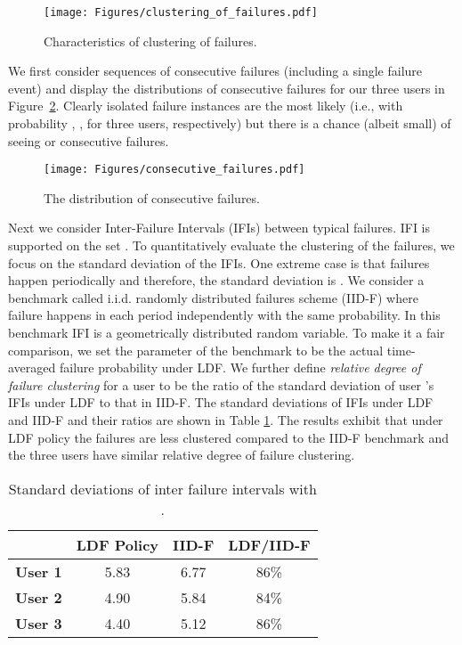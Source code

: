 \documentclass[prodmode,acmtompecs]{acmsmall}
\begin{document}
\begin{figure}[htp]
  \centering
  \texttt{[image: Figures/clustering\_of\_failures.pdf]}
  \caption{Characteristics of clustering of failures. }
  \label{figure_clustering_of_failures}
\end{figure}

We first consider sequences of consecutive failures (including a single failure event) and display the distributions of consecutive failures for our three users in Figure~{\ref{figure_consecutive_failures}}. Clearly isolated failure instances are the most likely (i.e., with probability , ,  for three users, respectively) but there is a chance (albeit small) of seeing  or  consecutive failures. 

\begin{figure}[htp]
  \centering
  \texttt{[image: Figures/consecutive\_failures.pdf]}
  \caption{The distribution of consecutive failures. }
  \label{figure_consecutive_failures}
\end{figure}

Next we consider Inter-Failure Intervals (IFIs) between typical failures. 
IFI is supported on the set . To quantitatively evaluate the clustering of the failures, we focus on the standard deviation of the IFIs. 
One extreme case is that failures happen periodically and therefore, the standard deviation is . 
We consider a benchmark called i.i.d. randomly distributed failures scheme (IID-F) where failure happens in each period independently with the same probability. 
In this benchmark IFI is a geometrically distributed random variable. 
To make it a fair comparison, we set the parameter of the benchmark to be the actual time-averaged failure probability under LDF. 
We further define {\em relative degree of failure clustering} for a user  to be the ratio of the standard deviation of user 's IFIs under LDF to that in IID-F.
The standard deviations of IFIs under LDF and IID-F and their ratios are shown in Table \ref{tab_sd_ifi}. 
The results exhibit that under LDF policy the failures are less clustered compared to the IID-F benchmark and the three users have similar relative degree of failure clustering. 

\begin{table}[h]
\normalsize
    \centering
    \begin{tabular}{| c | c | c | c |}
    \hline
    ~ & {\bf LDF Policy} & {\bf IID-F} & {\bf LDF/IID-F}\\
    \hline
    {\bf User 1} & 5.83 & 6.77 & 86\%	\\
    \hline
    {\bf User 2} & 4.90 & 5.84 & 84\%	\\
    \hline
    {\bf User 3} & 4.40 & 5.12 & 86\%	\\
    \hline
    \end{tabular}
    \caption{Standard deviations of inter failure intervals with . }
    \label{tab_sd_ifi}
\end{table}
\end{document}
